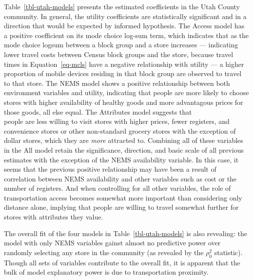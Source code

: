 \documentclass[
  letterpaper,
  DIV=11,
  numbers=noendperiod]{scrreport}
\begin{document}
Table~\ref{tbl-utah-models} presents the estimated coefficients in the
Utah County community. In general, the utility coefficients are
statistically significant and in a direction that would be expected by
informed hypothesis. The Access model has a positive coefficient on its
mode choice log-sum term, which indicates that as the mode choice logsum
between a block group and a store increases --- indicating lower travel
costs between Census block groups and the store, because travel times in
Equation~\ref{eq-mcls} have a negative relationship with utility --- a
higher proportion of mobile devices residing in that block group are
observed to travel to that store. The NEMS model shows a positive
relationship between both environment variables and utility, indicating
that people are more likely to choose stores with higher availability of
healthy goods and more advantagous prices for those goods, all else
equal. The Attributes model suggests that\\
people are less willing to visit stores with higher prices, fewer
registers, and convenience stores or other non-standard grocery stores
with the exception of dollar stores, which they are \emph{more}
attracted to. Combining all of these variables in the All model retain
the significance, direction, and basic scale of all previous estimates
with the exception of the NEMS availability variable. In this case, it
seems that the previous positive relationship may have been a result of
correlation between NEMS availability and other variables such as cost
or the number of registers. And when controlling for all other
variables, the role of transportation access becomes somewhat more
important than considering only distance alone, implying that people are
willing to travel somewhat further for stores with attributes they
value.

The overall fit of the four models in Table~\ref{tbl-utah-models} is
also revealing: the model with only NEMS variables gainst almost no
predictive power over randomly selecting any store in the community (as
revealed by the \(\rho_0^2\) statistic). Though all sets of variables
contribute to the overall fit, it is apparent that the bulk of model
explanatory power is due to transportation proximity.
\end{document}
